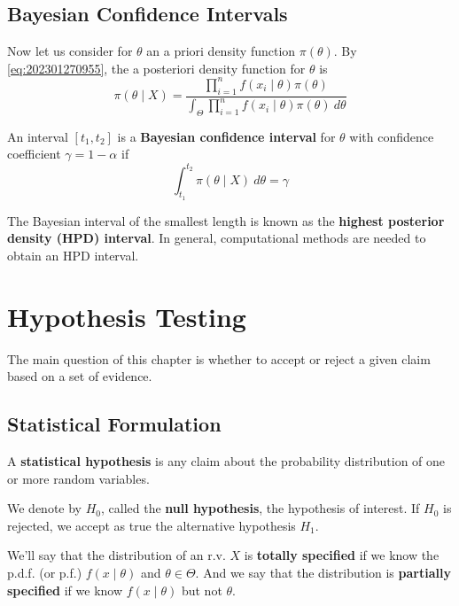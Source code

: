 \documentclass[12pt,a4paper]{report}
\begin{document}
\section{Bayesian Confidence Intervals}

Now let us consider for $\theta$ an a priori density function $\pi(\theta)$. By \eqref{eq:202301270955}, the a posteriori density function for $\theta$ is
\[
    \pi(\theta \mid X) = \frac{\prod_{i=1}^{n} f(x_i \mid \theta) \pi(\theta)}{\int_\Theta \prod_{i=1}^{n} f(x_i \mid \theta) \pi(\theta) ~d\theta} 
\]

\begin{definition}
    An interval $[t_1, t_2]$ is a \textbf{Bayesian confidence interval} for $\theta$ with confidence coefficient $\gamma = 1 - \alpha$ if 
    \begin{equation*}
        \int_{t_1}^{t_2} \pi(\theta \mid X)~d\theta = \gamma
    \end{equation*}
\end{definition}

The Bayesian interval of the smallest length is known as the \textbf{highest posterior density (HPD) interval}. In general, computational methods are needed to obtain an HPD interval. 

\chapter{Hypothesis Testing}

The main question of this chapter is whether to accept or reject a given claim based on a set of evidence. 

\section{Statistical Formulation}

\begin{definition}
    A \textbf{statistical hypothesis} is any claim about the probability distribution of one or more random variables.

    We denote by $H_0$, called the \textbf{null hypothesis}, the hypothesis of interest. If $H_0$ is rejected, we accept as true the alternative hypothesis $H_1$.
\end{definition}

We'll say that the distribution of an r.v. $X$ is \textbf{totally specified} if we know the p.d.f. (or p.f.) $f(x \mid \theta)$ and $\theta \in \Theta$. And we say that the distribution is \textbf{partially specified} if we know $f(x \mid \theta)$ but not $\theta$. 
\end{document}
